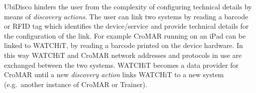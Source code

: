 UbiDisco hinders the user from the complexity of configuring technical details by means of \emph{discovery actions}. The user can link two systems by reading a barcode or RFID tag which identifies the device/service and provide technical details for the configuration of the link. For example CroMAR running on an iPad can be linked to WATCHiT, by reading a barcode printed on the device hardware. In this way WATCHiT and CroMAR network addresses and protocols in use are exchanged between the two systems. WATCHiT becomes a data provider for CroMAR until a new \emph{discovery action} links WATCHiT to a new system (e.g.~another instance of CroMAR or Trainer).

